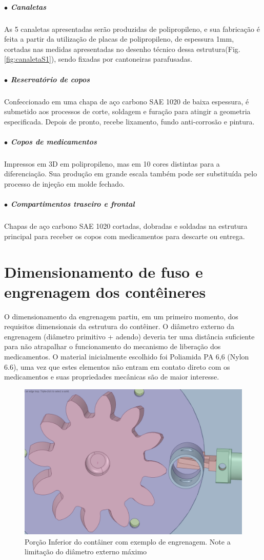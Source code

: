 \subparagraph*{$\bullet$ Canaletas} \hfill

As 5 canaletas apresentadas serão produzidas de polipropileno, e sua fabricação é feita a partir da utilização de placas de polipropileno, de espessura 1mm, cortadas nas medidas apresentadas no desenho técnico dessa estrutura(Fig. \ref{fig:canaletaS1}), sendo fixadas por cantoneiras parafusadas.

\subparagraph*{$\bullet$ Reservatório de copos} \hfill 

Confeccionado em uma chapa de aço carbono SAE 1020 de baixa espessura, é submetido aos processos de corte, soldagem e furação para atingir a geometria especificada. Depois de pronto, recebe lixamento, fundo anti-corrosão e pintura.

\subparagraph*{$\bullet$ Copos de medicamentos} \hfill

Impressos em 3D em polipropileno, mas em 10 cores distintas para a diferenciação. Sua produção em grande escala também pode ser substituída pelo processo de injeção em molde fechado. 

\subparagraph*{$\bullet$ Compartimentos traseiro e frontal} \hfill 

Chapas de aço carbono SAE 1020 cortadas, dobradas e soldadas na estrutura principal para receber os copos com medicamentos para descarte ou entrega.

\section{Dimensionamento de fuso e engrenagem dos contêineres} \label{section:dimensionamento_F_E} %

O dimensionamento da engrenagem partiu, em um primeiro momento, dos requisitos dimensionais da estrutura do contêiner. O diâmetro externo da engrenagem (diâmetro primitivo + adendo) deveria ter uma distância suficiente para não atrapalhar o funcionamento do mecanismo de liberação dos medicamentos. O material inicialmente escolhido foi Poliamida PA 6,6 (Nylon 6.6), uma vez que estes elementos não entram em contato direto com os medicamentos e suas propriedades mecânicas são de maior interesse.

\begin{figure}[H]
        \centering
        \includegraphics[width=.7\textwidth]{figuras/estrutura/Design/engrenagem_mangueira.png}
        \caption{Porção Inferior do contâiner com exemplo de engrenagem. Note a limitação do diâmetro externo máximo}
        \label{fig:mangueira_engrenagem}
    \end{figure} 


